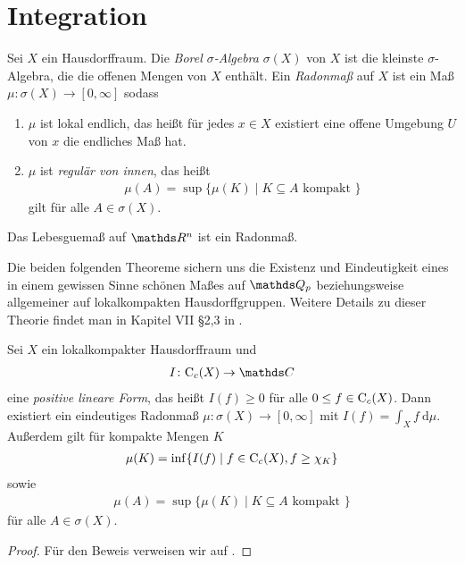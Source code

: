 \chapter{Integration}
\begin{defi}
Sei $X$ ein Hausdorffraum. Die \emph{Borel $\sigma$-Algebra} $\sigma(X)$ von $X$ ist die kleinste $\sigma$-Algebra, die die offenen Mengen von $X$ enthält.
Ein \emph{Radonmaß} auf $X$ ist ein Maß $\mu \colon \sigma(X) \to [0,\infty]$ sodass
\begin{enumerate}[label=\roman*)]
\item $\mu$ ist lokal endlich, das heißt für jedes $x\in X$ existiert eine offene Umgebung $U$ von $x$ die endliches Maß hat.
\item $\mu$ ist \emph{regulär von innen}, das heißt
\begin{align*}
\mu(A)=\sup\{\mu(K)\mid K\subseteq A \text{ kompakt }\}
\end{align*}
gilt für alle $A \in \sigma(X)$.
\end{enumerate}
\end{defi}

\begin{bsp}
Das Lebesguemaß auf $\Rn$ ist ein Radonmaß.
\end{bsp}

Die beiden folgenden Theoreme sichern uns die Existenz und Eindeutigkeit eines in einem gewissen Sinne schönen Maßes auf $\Q_p$ beziehungsweise allgemeiner auf lokalkompakten Hausdorffgruppen.
Weitere Details zu dieser Theorie findet man in Kapitel VII \S 2,3 in \cite{Elstrodt}.

\begin{thm}[Riesz]
Sei $X$ ein lokalkompakter Hausdorffraum und
\begin{align*}
I \colon \CC_c(X) \to \C
\end{align*}
eine \emph{positive lineare Form}, das heißt $I(f)\geq 0$ für alle $0\leq f \in \mathrm{C}_c(X)$.
Dann existiert ein eindeutiges Radonmaß $\mu \colon \sigma(X)\to [0,\infty]$ mit $I(f)=\int_X f ~\mathrm{d}\mu$.
Außerdem gilt für kompakte Mengen $K$
\begin{align*}
\mu(K)=\inf\{I(f)\mid f\in \mathrm{C}_c(X),f \geq \chi_K\}
\end{align*}
sowie
\begin{align*}
\mu(A)=\sup\{\mu(K)\mid K\subseteq A \text{ kompakt }\}
\end{align*}
für alle $A \in \sigma(X)$.
\end{thm}
\begin{proof}
Für den Beweis verweisen wir auf \cite[VII, 2.5]{Elstrodt}.
\end{proof}

